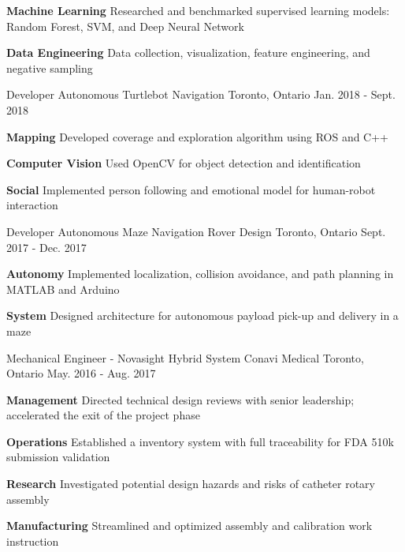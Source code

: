 \begin{cventries}
{\begin{cvitems}
			\item {\textbf{Machine Learning} Researched and benchmarked supervised learning models: Random Forest, SVM, and Deep Neural Network}
			\item {\textbf{Data Engineering} Data collection, visualization, feature engineering, and negative sampling }
		\end{cvitems}
	}
	\cventry
	{Developer}
	{Autonomous Turtlebot Navigation}
	{Toronto, Ontario}
	{Jan. 2018 - Sept. 2018}
	{
		\begin{cvitems}
			\item {\textbf{Mapping} Developed coverage and exploration algorithm using ROS and C++}
			\item {\textbf{Computer Vision} Used OpenCV for object detection and identification}
			\item {\textbf{Social} Implemented person following and emotional model for human-robot interaction}
		\end{cvitems}
	}
	\cventry
	{Developer}
	{Autonomous Maze Navigation Rover Design}
	{Toronto, Ontario}
	{Sept. 2017 - Dec. 2017}
	{
		\begin{cvitems}
			\item { \textbf{Autonomy} Implemented localization, collision avoidance, and path planning in MATLAB and Arduino}
			\item { \textbf{System} Designed architecture for autonomous payload pick-up and delivery in a maze}
		\end{cvitems}
	}
	\cventry
	{Mechanical Engineer - Novasight Hybrid System}
	{Conavi Medical} 
	{Toronto, Ontario}
	{May. 2016 - Aug. 2017}
	{
		\begin{cvitems}
			\item {
				\textbf{Management} Directed technical design reviews with senior leadership; accelerated the exit of the project phase
			}
			\item {
				\textbf{Operations} Established a inventory system with full traceability for FDA 510k submission validation
			}
			\item {
				\textbf{Research} Investigated potential design hazards and risks of catheter rotary assembly
			}
			\item {
				\textbf{Manufacturing} Streamlined and optimized assembly and calibration work instruction
			}
		\end{cvitems}
	}  
\end{cventries}
